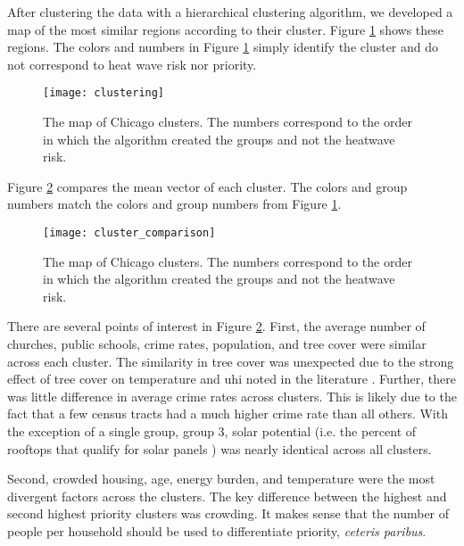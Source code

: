 After clustering the data with a hierarchical clustering algorithm, we developed
a map of the most similar regions according to their cluster. Figure \ref{fig:clustering}
shows these regions. The colors and numbers in Figure \ref{fig:clustering} simply
identify the cluster and do not correspond to heat wave risk nor priority.

\begin{figure}[H]
    \begin{center}
      \texttt{[image: clustering]}
      \caption{The map of Chicago clusters. The numbers correspond to the order
      in which the algorithm created the groups and not the heatwave risk.}
      \label{fig:clustering}
    \end{center}
\end{figure}

Figure \ref{fig:cluster_compare} compares the mean vector of each cluster. The
colors and group numbers match the colors and group numbers from Figure
\ref{fig:clustering}.

\begin{figure}[H]
    \begin{center}
      \texttt{[image: cluster\_comparison]}
      \caption{The map of Chicago clusters. The numbers correspond to the order
      in which the algorithm created the groups and not the heatwave risk.}
      \label{fig:cluster_compare}
    \end{center}
\end{figure}

There are several points of interest in Figure \ref{fig:cluster_compare}. First,
the average number of churches, public schools, crime rates, population, and tree
cover were similar across each cluster. The similarity in tree cover was unexpected
due to the strong effect of tree cover on temperature and \ac{uhi} noted in the
literature \cite{mcdonald_tree_2021,marando_urban_2022,schwaab_role_2021}. Further,
there was little difference in average crime rates across clusters. This is likely
due to the fact that a few census tracts had a much higher crime rate than all others.
With the exception of a single group, group 3, solar potential (i.e. the percent
of rooftops that qualify for solar panels \cite{google_project_2022}) was nearly
identical across all clusters.

Second, crowded housing, age, energy burden, and temperature were the most divergent
factors across the clusters. The key difference between the highest and second
highest priority clusters was crowding. It makes sense that the number of people
per household should be used to differentiate priority, \textit{ceteris paribus}.

